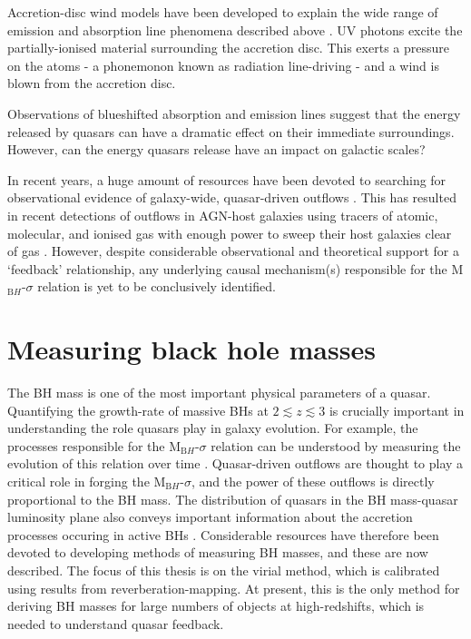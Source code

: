 Accretion-disc wind models have been developed to explain the wide range of emission and absorption line phenomena described above \citep[e.g.][]{murray95,elvis00,proga00,everett05}.
UV photons excite the partially-ionised material surrounding the accretion disc. 
This exerts a pressure on the atoms - a phonemonon known as radiation line-driving - and a wind is blown from the accretion disc. 

Observations of blueshifted absorption and emission lines suggest that the energy released by quasars can have a dramatic effect on their immediate surroundings.  
However, can the energy quasars release have an impact on galactic scales? 

In recent years, a huge amount of resources have been devoted to searching for observational evidence of galaxy-wide, quasar-driven outflows \citep[for recent reviews, see][]{alexander12,fabian12,heckman14}. 
This has resulted in recent detections of outflows in AGN-host galaxies using tracers of atomic, molecular, and ionised gas with enough power to sweep their host galaxies clear of gas \citep[e.g.][]{nesvadba06,arav08,nesvadba08,moe09,dunn10,alexander10,harrison12,harrison14,nesvadba10,rupke13,veilleux13,nardini15,feruglio10,alatalo11,cimatti13,cicone14}.  
However, despite considerable observational and theoretical support for a `feedback' relationship, any underlying causal mechanism(s) responsible for the M$_{\mathrm BH}$-$\sigma$ relation is yet to be conclusively identified. 

\section{Measuring black hole masses}

The BH mass is one of the most important physical parameters of a quasar. 
Quantifying the growth-rate of massive BHs at $2 \lesssim z \lesssim 3$ is crucially important in understanding the role quasars play in galaxy evolution.
For example, the processes responsible for the M$_{\mathrm BH}$-$\sigma$ relation can be understood by measuring the evolution of this relation over time \citep[e.g.][]{bennert11}. 
Quasar-driven outflows are thought to play a critical role in forging the M$_{\mathrm BH}$-$\sigma$, and the power of these outflows is directly proportional to the BH mass. 
The distribution of quasars in the BH mass-quasar luminosity plane also conveys important information about the accretion processes occuring in active BHs \citep[e.g.][]{kollmeier06}.
Considerable resources have therefore been devoted to developing methods of measuring BH masses, and these are now described. 
The focus of this thesis is on the virial method, which is calibrated using results from reverberation-mapping. 
At present, this is the only method for deriving BH masses for large numbers of objects at high-redshifts, which is needed to understand quasar feedback. 

